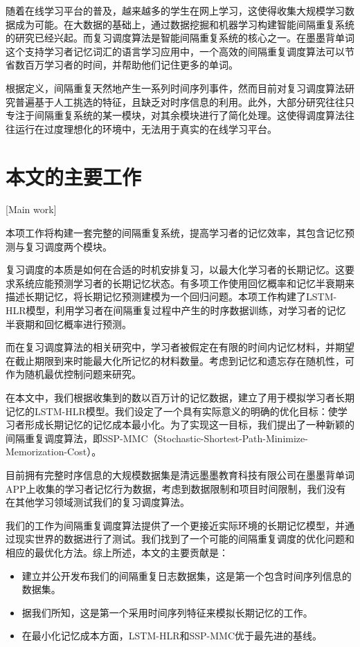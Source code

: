 随着在线学习平台的普及，越来越多的学生在网上学习，这使得收集大规模学习数据成为可能。在大数据的基础上，通过数据挖掘和机器学习构建智能间隔重复系统的研究已经兴起。而复习调度算法是智能间隔重复系统的核心之一。在墨墨背单词这个支持学习者记忆词汇的语言学习应用中，一个高效的间隔重复调度算法可以节省数百万学习者的时间，并帮助他们记住更多的单词。

根据定义，间隔重复天然地产生一系列时间序列事件，然而目前对复习调度算法研究普遍基于人工挑选的特征，且缺乏对时序信息的利用。此外，大部分研究往往只专注于间隔重复系统的某一模块，对其余模块进行了简化处理。这使得调度算法往往运行在过度理想化的环境中，无法用于真实的在线学习平台。

\section{本文的主要工作}[Main work]

本项工作将构建一套完整的间隔重复系统，提高学习者的记忆效率，其包含记忆预测与复习调度两个模块。

复习调度的本质是如何在合适的时机安排复习，以最大化学习者的长期记忆。这要求系统应能预测学习者的长期记忆状态。有多项工作\cite{settlesTrainableSpacedRepetition2016,zaidiAdaptiveForgettingCurves2020}使用回忆概率和记忆半衰期来描述长期记忆，将长期记忆预测建模为一个回归问题。本项工作构建了LSTM-HLR模型，利用学习者在间隔重复过程中产生的时序数据训练，对学习者的记忆半衰期和回忆概率进行预测。

而在复习调度算法的相关研究中，学习者被假定在有限的时间内记忆材料，并期望在截止期限到来时能最大化所记忆的材料数量\cite{reddyAcceleratingHumanLearning2017}。考虑到记忆和遗忘存在随机性，可作为随机最优控制问题来研究。

在本文中，我们根据收集到的数以百万计的记忆数据，建立了用于模拟学习者长期记忆的LSTM-HLR模型。我们设定了一个具有实际意义的明确的优化目标：使学习者形成长期记忆的记忆成本最小化。为了实现这一目标，我们提出了一种新颖的间隔重复调度算法，即SSP-MMC（Stochastic-Shortest-Path-Minimize-Memorization-Cost）。

目前拥有完整时序信息的大规模数据集是清远墨墨教育科技有限公司在墨墨背单词APP上收集的学习者记忆行为数据，考虑到数据限制和项目时间限制，我们没有在其他学习领域测试我们的复习调度算法。

我们的工作为间隔重复调度算法提供了一个更接近实际环境的长期记忆模型，并通过现实世界的数据进行了测试。我们找到了一个可能的间隔重复调度的优化问题和相应的最优化方法。综上所述，本文的主要贡献是：

\begin{itemize}
    \item 建立并公开发布我们的间隔重复日志数据集，这是第一个包含时间序列信息的数据集。
    \item 据我们所知，这是第一个采用时间序列特征来模拟长期记忆的工作。
    \item 在最小化记忆成本方面，LSTM-HLR和SSP-MMC优于最先进的基线。
\end{itemize}

